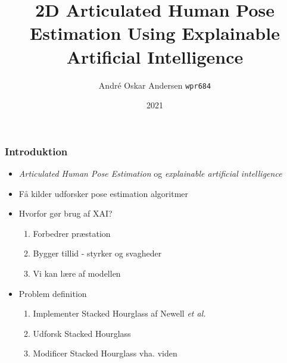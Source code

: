 \documentclass{beamer}
\begin{document}
\beamertemplatenavigationsymbolsempty

\title{2D Articulated Human Pose Estimation
\newline \small Using Explainable Artificial Intelligence}

\author{André Oskar Andersen
\newline \small \texttt{wpr684}}


\date{2021}

\frame{\titlepage}

\begin{frame}
    \frametitle{Introduktion}
    \begin{minipage}{0.5\textwidth}
        \begin{itemize}
          \item<1-> \textit{Articulated Human Pose Estimation} og \textit{explainable artificial intelligence}
          \item <2-> Få kilder udforsker pose estimation algoritmer
        \end{itemize}
      \end{minipage} \hfill
      \begin{minipage}{0.45\textwidth}
        \begin{itemize}
            \item <3-> Hvorfor gør brug af XAI?
            \begin{enumerate}
                \item Forbedrer præstation
                \item Bygger tillid - styrker og svagheder
                \item Vi kan lære af modellen
            \end{enumerate}
            \item<4-> Problem definition
            \begin{enumerate}
                \item Implementer Stacked Hourglass af Newell \textit{et al.}
                \item Udforsk Stacked Hourglass
                \item Modificer Stacked Hourglass vha. viden
            \end{enumerate}
        \end{itemize}
      \end{minipage}
\end{frame}
\end{document}
